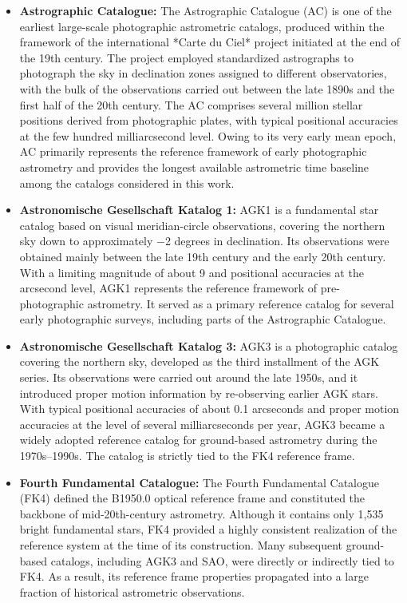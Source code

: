 \documentclass{aastex701}
\begin{document}
\begin{itemize}
    \item \textbf{Astrographic Catalogue:} \label{subsubsec:ac} The Astrographic Catalogue (AC) is one of the earliest large-scale photographic astrometric catalogs, produced within the framework of the international *Carte du Ciel* project initiated at the end of the 19th century. The project employed standardized astrographs to photograph the sky in declination zones assigned to different observatories, with the bulk of the observations carried out between the late 1890s and the first half of the 20th century. The AC comprises several million stellar positions derived from photographic plates, with typical positional accuracies at the few hundred milliarcsecond level. Owing to its very early mean epoch, AC primarily represents the reference framework of early photographic astrometry and provides the longest available astrometric time baseline among the catalogs considered in this work.

    \item \textbf{Astronomische Gesellschaft Katalog 1:} \label{subsubsec:agk1} AGK1 is a fundamental star catalog based on visual meridian-circle observations, covering the northern sky down to approximately −2 degrees in declination. Its observations were obtained mainly between the late 19th century and the early 20th century. With a limiting magnitude of about 9 and positional accuracies at the arcsecond level, AGK1 represents the reference framework of pre-photographic astrometry. It served as a primary reference catalog for several early photographic surveys, including parts of the Astrographic Catalogue.

    \item \textbf{Astronomische Gesellschaft Katalog 3:} \label{subsubsec:agk3} AGK3 is a photographic catalog covering the northern sky, developed as the third installment of the AGK series. Its observations were carried out around the late 1950s, and it introduced proper motion information by re-observing earlier AGK stars. With typical positional accuracies of about 0.1 arcseconds and proper motion accuracies at the level of several milliarcseconds per year, AGK3 became a widely adopted reference catalog for ground-based astrometry during the 1970s–1990s. The catalog is strictly tied to the FK4 reference frame.

    \item \textbf{Fourth Fundamental Catalogue:} \label{subsubsec:fk4} The Fourth Fundamental Catalogue (FK4) defined the B1950.0 optical reference frame and constituted the backbone of mid-20th-century astrometry. Although it contains only 1,535 bright fundamental stars, FK4 provided a highly consistent realization of the reference system at the time of its construction. Many subsequent ground-based catalogs, including AGK3 and SAO, were directly or indirectly tied to FK4. As a result, its reference frame properties propagated into a large fraction of historical astrometric observations.


\end{itemize}
\end{document}
